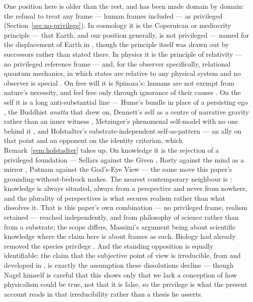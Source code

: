 \documentclass[11pt,a4paper]{article}
\theoremstyle{remark}\newtheorem{remark}[definition]{Remark}
\begin{document}
One position here is older than the rest, and has been made domain by domain: the
refusal to treat any frame --- human frames included --- as privileged
(Section~\ref{sec:no-privilege}). In cosmology it is the
Copernican or mediocrity principle --- that Earth, and our position generally, is not privileged
--- named for the displacement of Earth in \citet{copernicus1543}, though the principle itself was
drawn out by successors rather than stated there. In physics it is the principle of relativity --- no privileged
reference frame \citep{einstein1905} --- and, for the observer specifically, relational
quantum mechanics, in which states are relative to any physical system and no observer is
special \citep{rovelli1996}. On free will it is Spinoza's: humans are not exempt from
nature's necessity, and feel free only through ignorance of their causes
\citep{spinoza1677}. On the self it is a long anti-substantial line --- Hume's bundle in
place of a persisting ego \citep{hume1739}, the Buddhist \emph{anatta} that \citet{parfit1984} drew on,
Dennett's self as a centre of narrative gravity rather than an inner witness
\citep{dennett1991}, Metzinger's phenomenal self-model with no one behind it
\citep{metzinger2003}, and Hofstadter's substrate-independent self-as-pattern
\citep{hofstadter2007} --- an ally on that point and an opponent on the identity criterion, which
Remark~\ref{rem:hofstadter} takes up. On knowledge it is the rejection of a privileged foundation ---
Sellars against the Given \citep{sellars1956}, Rorty against the mind as a mirror
\citep{rorty1979}, Putnam against the God's-Eye View \citep{putnam1981} --- the same move
this paper's grounding-without-bedrock makes. The nearest contemporary neighbour is
\citet{massimi2022}: knowledge is always situated, always from a perspective and never
from nowhere, and the plurality of perspectives is what secures realism rather than
what dissolves it. That is this paper's own combination --- no privileged frame,
realism retained --- reached independently, and from philosophy of science rather than
from a substrate; the scope differs, Massimi's argument being about scientific
knowledge where the claim here is about frames as such. Biology had already removed the species
privilege \citep{darwin1871}. And the standing opposition is equally identifiable: the
claim that the subjective point of view is irreducible, from \citet{nagel1974} and developed in
\citet{nagel1986}, is exactly the assumption these dissolutions decline --- though Nagel himself
is careful that this shows only that we lack a conception of how physicalism could be true, not
that it is false, so the privilege is what the present account reads in that irreducibility
rather than a thesis he asserts.
\end{document}
